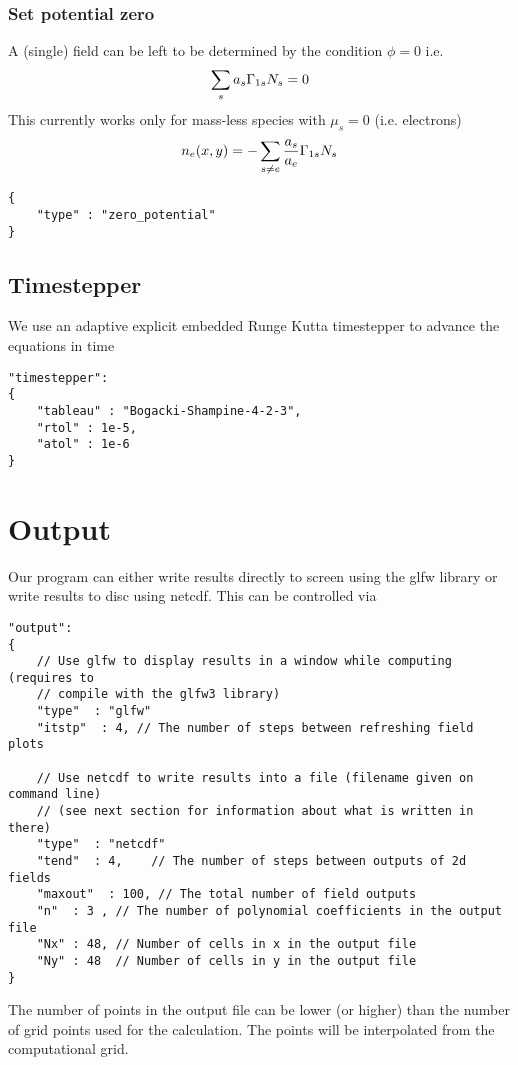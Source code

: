 \subsubsection{ Set potential zero}
A (single) field can be left to be determined by the condition $\phi = 0$ i.e.
\begin{align}
    \sum_s a_s \Gamma_{1s} {N_s}  = 0
\end{align}
This currently works only for mass-less species with $\mu_s =0$ (i.e. electrons)
\begin{align}
    n_e(x,y) = -\sum_{s\neq e} \frac{a_s}{a_e} \Gamma_{1s}{N_s} 
\end{align}
\begin{verbatim}
{
    "type" : "zero_potential"
}
\end{verbatim}
\subsection{Timestepper}
We use an adaptive explicit embedded Runge Kutta timestepper to advance the equations in time
\begin{verbatim}
"timestepper":
{
    "tableau" : "Bogacki-Shampine-4-2-3",
    "rtol" : 1e-5,
    "atol" : 1e-6
}
\end{verbatim}

\section{Output}
Our program can either write results directly to screen using the glfw library
or write results to disc using netcdf.
This can be controlled via
\begin{verbatim}
"output":
{
    // Use glfw to display results in a window while computing (requires to
    // compile with the glfw3 library)
    "type"  : "glfw"
    "itstp"  : 4, // The number of steps between refreshing field plots

    // Use netcdf to write results into a file (filename given on command line)
    // (see next section for information about what is written in there)
    "type"  : "netcdf"
    "tend"  : 4,    // The number of steps between outputs of 2d fields
    "maxout"  : 100, // The total number of field outputs
    "n"  : 3 , // The number of polynomial coefficients in the output file
    "Nx" : 48, // Number of cells in x in the output file
    "Ny" : 48  // Number of cells in y in the output file
}
\end{verbatim}
The number of points in the output file can be lower (or higher) than the number of
grid points used for the calculation. The points will be interpolated from the
computational grid.
